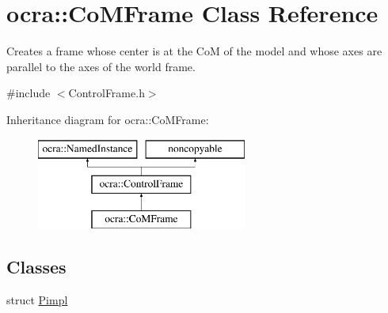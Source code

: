 \hypertarget{classocra_1_1CoMFrame}{}\section{ocra\+:\+:Co\+M\+Frame Class Reference}
\label{classocra_1_1CoMFrame}


Creates a frame whose center is at the CoM of the model and whose axes are parallel to the axes of the world frame.  




{\ttfamily \#include $<$Control\+Frame.\+h$>$}

Inheritance diagram for ocra\+:\+:Co\+M\+Frame\+:\begin{figure}[H]
\begin{center}
\leavevmode
\includegraphics[height=3.000000cm]{d9/d52/classocra_1_1CoMFrame}
\end{center}
\end{figure}
\subsection*{Classes}
\begin{DoxyCompactItemize}
\item 
struct \hyperlink{structocra_1_1CoMFrame_1_1Pimpl}{Pimpl}
\end{DoxyCompactItemize}
